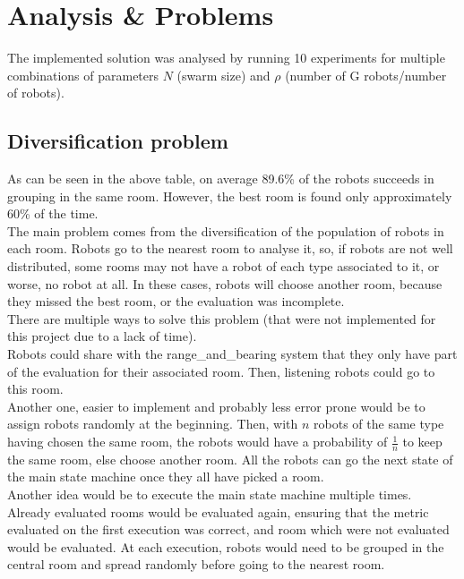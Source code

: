 \section{Analysis \& Problems}

The implemented solution was analysed by running 10 experiments for multiple
combinations of parameters $N$ (swarm size) and $\rho$
(number of G robots/number of robots).



\subsection{Diversification problem}

As can be seen in the above table, on average 89.6\% of the robots succeeds in grouping in the same room. However, the best room is found only approximately
60\% of the time.\\

The main problem comes from the diversification of the population of robots in
each room. Robots go to the nearest room to analyse it, so, if robots are not
well distributed, some rooms may not have a robot of each type associated to it,
or worse, no robot at all. In these cases, robots will choose another room,
because they missed the best room, or the evaluation was incomplete.\\

There are multiple ways to solve this problem (that were not implemented for
this project due to a lack of time).\\

Robots could share with the range\_and\_bearing system that they only have part of
the evaluation for their associated room. Then, listening robots could go to
this room.\\

Another one, easier to implement and probably less error prone would be to
assign robots randomly at the beginning. Then, with $n$ robots of the same type
having chosen the same room, the robots would have a probability of
$\frac{1}{n}$ to keep the same room, else choose another room. All the robots
can go the next state of the main state machine once they all have picked a
room.\\

Another idea would be to execute the main state machine multiple times. Already
evaluated rooms would be evaluated again, ensuring that the metric evaluated on
the first execution was correct, and room which were not evaluated would be
evaluated. At each execution, robots would need to be grouped in the central
room and spread randomly before going to the nearest room.

